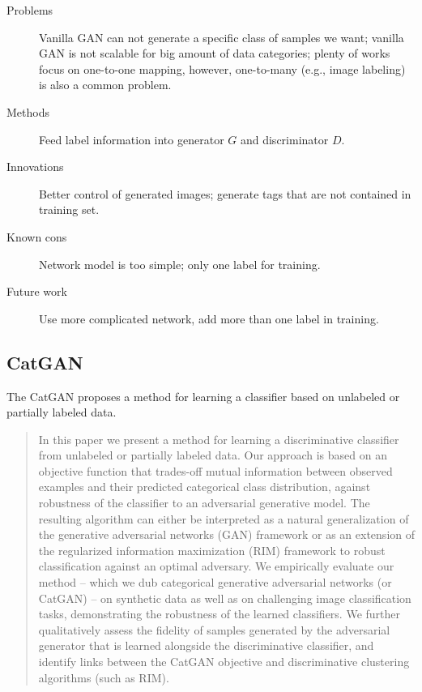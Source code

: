 \documentclass[12pt]{utils/mydoc}
\begin{document}
\begin{description}
  \item[Problems] Vanilla GAN can not generate a specific class of samples we want; vanilla GAN
    is not scalable for big amount of data categories; plenty of works focus on one-to-one
    mapping, however, one-to-many (e.g., image labeling) is also a common problem.
  \item[Methods] Feed label information into generator $G$ and discriminator $D$.
  \item[Innovations] Better control of generated images; generate tags that are not contained
    in training set.
  \item[Known cons] Network model is too simple; only one label for training.
  \item[Future work] Use more complicated network, add more than one label in training.
\end{description}

\subsection{CatGAN}

The CatGAN\cite{springenberg2015unsupervised} proposes a method for learning a classifier
based on unlabeled or partially labeled data.

\begin{abstract}
  In this paper we present a method for learning a discriminative classifier from
  unlabeled or partially labeled data. Our approach is based on an objective function
  that trades-off mutual information between observed examples and their predicted
  categorical class distribution, against robustness of the classifier to an adversarial
  generative model. The resulting algorithm can either be interpreted as a natural
  generalization of the generative adversarial networks (GAN) framework or as an
  extension of the regularized information maximization (RIM) framework to robust
  classification against an optimal adversary. We empirically evaluate our method
  – which we dub categorical generative adversarial networks (or CatGAN) – on
  synthetic data as well as on challenging image classification tasks, demonstrating
  the robustness of the learned classifiers. We further qualitatively assess the fidelity
  of samples generated by the adversarial generator that is learned alongside the
  discriminative classifier, and identify links between the CatGAN objective and
  discriminative clustering algorithms (such as RIM).
\end{abstract}
\end{document}
